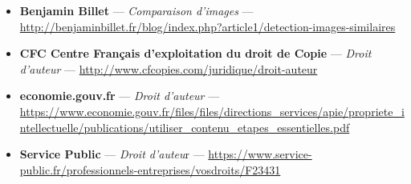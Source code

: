 \documentclass[a4paper,12pt]{article}
\begin{document}
\begin{itemize}
    \item \textbf{Benjamin Billet} — \textit{Comparaison d'images} — \url{http://benjaminbillet.fr/blog/index.php?article1/detection-images-similaires }
    \item \textbf{CFC Centre Français d'exploitation du droit de Copie} — \textit{Droit d'auteur} — \url{http://www.cfcopies.com/juridique/droit-auteur }
    \item \textbf{economie.gouv.fr} — \textit{Droit d'auteur} — \url{https://www.economie.gouv.fr/files/files/directions_services/apie/propriete_intellectuelle/publications/utiliser_contenu_etapes_essentielles.pdf }
    \item \textbf{Service Public} — \textit{Droit d'auteu}r — \url{https://www.service-public.fr/professionnels-entreprises/vosdroits/F23431 }
   
    
    
\end{itemize}






	


\end{document}
